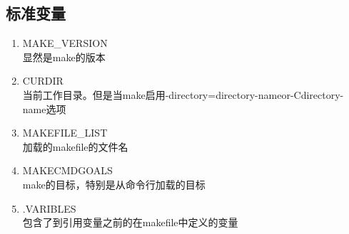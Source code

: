 \subsection{标准变量}
\begin{enumerate}
	\item MAKE\_VERSION\\
	显然是make的版本
	\item CURDIR\\ 
	当前工作目录。但是当make启用-directory=directory-nameor-Cdirectory-name选项
	\item MAKEFILE\_LIST\\
	加载的makefile的文件名
	\item MAKECMDGOALS\\
	make的目标，特别是从命令行加载的目标
	\item .VARIBLES\\
	包含了到引用变量之前的在makefile中定义的变量
\end{enumerate}
